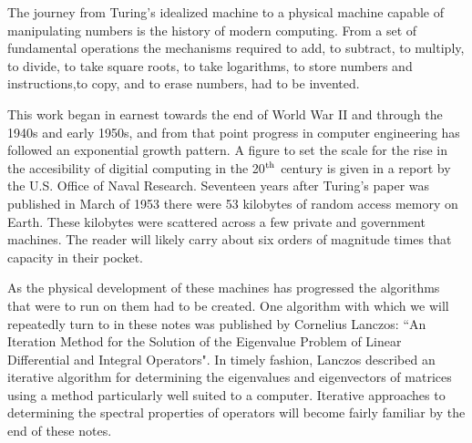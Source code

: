 The journey from Turing's idealized machine to a physical machine capable of manipulating
numbers is the history of modern computing. From a set of fundamental operations
the mechanisms required to add, to subtract, to multiply, to divide, to take square roots, 
to take logarithms, to store numbers and instructions,to copy, and to erase numbers, had to be 
invented. 


This work began in earnest towards the end of World War II and through the 1940s and early 1950s,
and from that point progress in computer engineering has followed an exponential growth pattern.
A figure to set the scale for the rise in the accesibility of digitial computing 
in the 20$^{\rm th}$ century is given in a report
by the U.S. Office of Naval Research. Seventeen years after Turing's paper 
was published in March of 1953 there were 53 kilobytes of 
random access memory on Earth.\cite{dyson12, usonr53}
These kilobytes were scattered across a few private and government machines. 
The reader will likely carry about six orders of magnitude times that capacity in their pocket.


As the physical development of these machines has progressed 
the algorithms that were to run on them had to be created.
One algorithm with which we will repeatedly turn to in these notes 
was published by Cornelius Lanczos: ``An Iteration Method for the Solution of the Eigenvalue Problem of Linear
Differential and Integral Operators"\cite{lanczos50}. In timely fashion, Lanczos described 
an iterative algorithm for determining the eigenvalues and eigenvectors of
matrices using a method particularly well suited to a computer. 
Iterative approaches to determining the spectral properties of operators 
will become fairly familiar by the end of these notes. 

